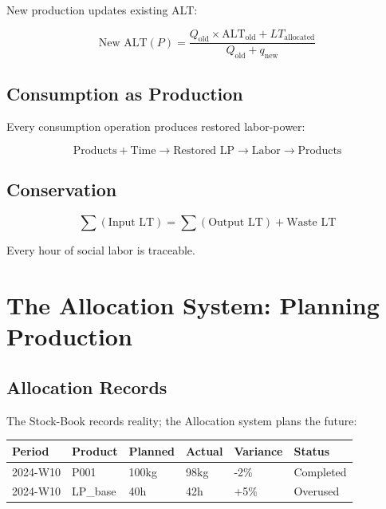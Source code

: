 \documentclass[12pt,a4paper]{article}
\begin{document}
New production updates existing ALT:

\begin{equation}
\text{New ALT}(P) = \frac{Q_{\text{old}} \times \text{ALT}_{\text{old}} + LT_{\text{allocated}}}{Q_{\text{old}} + q_{\text{new}}}
\end{equation}

\subsection{Consumption as Production}

Every consumption operation produces restored labor-power:

\begin{equation}
\text{Products} + \text{Time} \rightarrow \text{Restored LP} \rightarrow \text{Labor} \rightarrow \text{Products}
\end{equation}

\subsection{Conservation}

\begin{equation}
\sum(\text{Input LT}) = \sum(\text{Output LT}) + \text{Waste LT}
\end{equation}

Every hour of social labor is traceable.

\section{The Allocation System: Planning Production}

\subsection{Allocation Records}

The Stock-Book records reality; the Allocation system plans the future:

\begin{table}[h]
\centering
\small
\begin{tabular}{llllll}
\hline
Period & Product & Planned & Actual & Variance & Status \\
\hline
2024-W10 & P001 & 100kg & 98kg & -2\% & Completed \\
2024-W10 & LP\_base & 40h & 42h & +5\% & Overused \\
\hline
\end{tabular}
\end{table}
\end{document}
